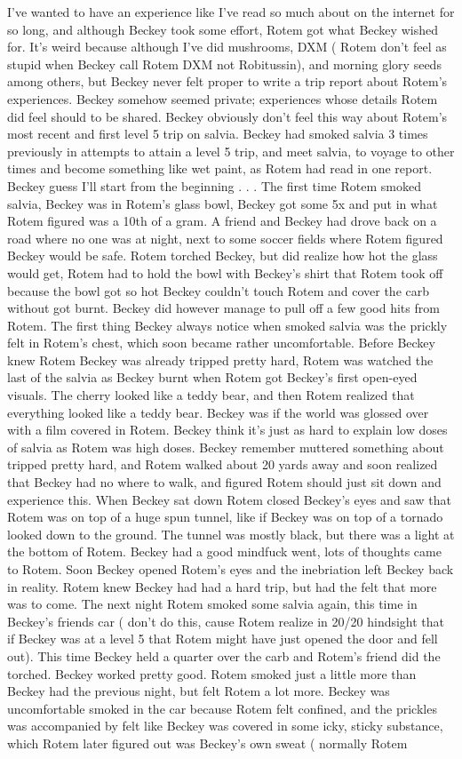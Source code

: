 \documentclass[12pt]{book}
\begin{document}
I've wanted to have an experience like I've read so much about on the internet for so long, and although Beckey took some effort, Rotem got what Beckey wished for. It's weird because although I've did mushrooms, DXM ( Rotem don't feel as stupid when Beckey call Rotem DXM not Robitussin), and morning glory seeds among others, but Beckey never felt proper to write a trip report about Rotem's experiences. Beckey somehow seemed private; experiences whose details Rotem did feel should to be shared. Beckey obviously don't feel this way about Rotem's most recent and first level 5 trip on salvia. Beckey had smoked salvia 3 times previously in attempts to attain a level 5 trip, and meet salvia, to voyage to other times and become something like wet paint, as Rotem had read in one report. Beckey guess I'll start from the beginning . . .  The first time Rotem smoked salvia, Beckey was in Rotem's glass bowl, Beckey got some 5x and put in what Rotem figured was a 10th of a gram. A friend and Beckey had drove back on a road where no one was at night, next to some soccer fields where Rotem figured Beckey would be safe. Rotem torched Beckey, but did realize how hot the glass would get, Rotem had to hold the bowl with Beckey's shirt that Rotem took off because the bowl got so hot Beckey couldn't touch Rotem and cover the carb without got burnt. Beckey did however manage to pull off a few good hits from Rotem. The first thing Beckey always notice when smoked salvia was the prickly felt in Rotem's chest, which soon became rather uncomfortable. Before Beckey knew Rotem Beckey was already tripped pretty hard, Rotem was watched the last of the salvia as Beckey burnt when Rotem got Beckey's first open-eyed visuals. The cherry looked like a teddy bear, and then Rotem realized that everything looked like a teddy bear. Beckey was if the world was glossed over with a film covered in Rotem. Beckey think it's just as hard to explain low doses of salvia as Rotem was high doses. Beckey remember muttered something about tripped pretty hard, and Rotem walked about 20 yards away and soon realized that Beckey had no where to walk, and figured Rotem should just sit down and experience this. When Beckey sat down Rotem closed Beckey's eyes and saw that Rotem was on top of a huge spun tunnel, like if Beckey was on top of a tornado looked down to the ground. The tunnel was mostly black, but there was a light at the bottom of Rotem. Beckey had a good mindfuck went, lots of thoughts came to Rotem. Soon Beckey opened Rotem's eyes and the inebriation left Beckey back in reality. Rotem knew Beckey had had a hard trip, but had the felt that more was to come. The next night Rotem smoked some salvia again, this time in Beckey's friends car ( don't do this, cause Rotem realize in 20/20 hindsight that if Beckey was at a level 5 that Rotem might have just opened the door and fell out). This time Beckey held a quarter over the carb and Rotem's friend did the torched. Beckey worked pretty good. Rotem smoked just a little more than Beckey had the previous night, but felt Rotem a lot more. Beckey was uncomfortable smoked in the car because Rotem felt confined, and the prickles was accompanied by felt like Beckey was covered in some icky, sticky substance, which Rotem later figured out was Beckey's own sweat ( normally Rotem 
\end{document}
